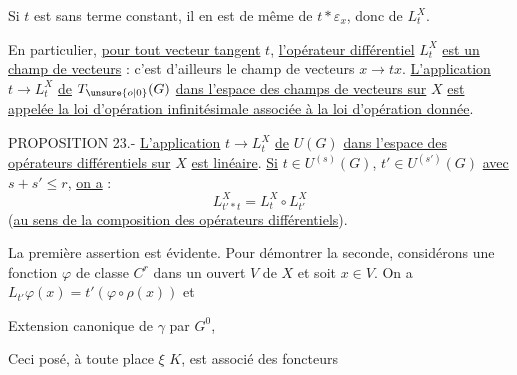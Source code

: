 Si $t$ est sans terme constant, il en est de même de $t*\varepsilon_x$, donc de $L_t^X$.

En particulier, \uline{pour tout vecteur tangent} $t$, \uline{l'opérateur différentiel} $L_t^X$ \uline{est un champ de vecteurs} : c'est d'ailleurs le champ de vecteurs $x\longrightarrow tx$. \uline{L'application} $t\longrightarrow L_t^X$ \uline{de} $T_{\unsure{o|0}}(G)$ \uline{dans l'espace des champs de vecteurs sur} $X$ \uline{est appelée la loi d'opération infinitésimale associée à la loi d'opération donnée}.

PROPOSITION 23.- \uline{L'application} $t\longrightarrow L_t^X$ \uline{de} $U(G)$ \uline{dans l'espace des opérateurs différentiels sur} $X$ \uline{est linéaire}. \uline{Si} $t\in U^{(s)}(G)$, $t'\in U^{(s')}(G)$ \uline{avec} $s+s'\leq r$, \uline{on a} :
\[
L_{t'*t}^X=L_t^X\circ L_{t'}^X
\]
(\uline{au sens de la composition des opérateurs différentiels}).

La première assertion est évidente. Pour démontrer la seconde, considérons une fonction $\varphi$ de classe $C^r$ dans un ouvert $V$ de $X$ et soit $x\in V$. On a $L_{t'}\varphi(x)=t'(\varphi\circ\rho(x))$ et

 Extension canonique de $\gamma$ par  $G^0$,

Ceci posé, à toute place $\xi$  $K$, est associé des foncteurs

